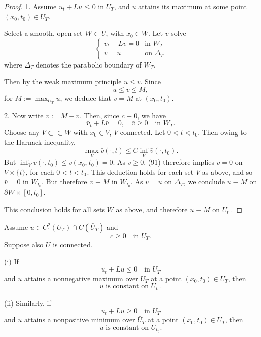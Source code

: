 \begin{proof}
1. Assume $u_t + Lu \leq 0$ in $U_T$, and $u$ attains its maximum at some point $(x_0, t_0) \in U_T$.

Select a smooth, open set $W \subset U$, with $x_0 \in W$. Let $v$ solve
\[
\begin{cases} v_t + Lv = 0 & \text{in } W_T \\ v = u & \text{on } \Delta_T \end{cases}
\]
where $\Delta_T$ denotes the parabolic boundary of $W_T$.

Then by the weak maximum principle $u \leq v$. Since
\[
u \leq v \leq M,
\]
for $M := \max_{U_T} u$, we deduce that $v = M$ at $(x_0, t_0)$.

2. Now write $\bar{v} := M - v$. Then, since $c \equiv 0$, we have
\[
\bar{v}_t + L\bar{v} = 0, \quad \bar{v} \geq 0 \quad \text{in } W_T.
\tag{90}
\]
Choose any $V \subset\subset W$ with $x_0 \in V$, $V$ connected. Let $0 < t < t_0$. Then owing to the Harnack inequality,
\[
\max_V \bar{v}(\cdot, t) \leq C \inf_V \bar{v}(\cdot, t_0).
\tag{91}
\]
But $\inf_V \bar{v}(\cdot, t_0) \leq \bar{v}(x_0, t_0) = 0$. As $\bar{v} \geq 0$, (91) therefore implies $\bar{v} = 0$ on $V \times \{t\}$, for each $0 < t < t_0$. This deduction holds for each set $V$ as above, and so $\bar{v} = 0$ in $W_{t_0}$. But therefore $v \equiv M$ in $W_{t_0}$. As $v = u$ on $\Delta_T$, we conclude $u \equiv M$ on $\partial W \times [0, t_0]$.

This conclusion holds for all sets $W$ as above, and therefore $u \equiv M$ on $U_{t_0}$.
\end{proof}

\begin{theorem}
\label{thm:parabolic-strong-maximum-principle-c-nonneg}
Assume $u \in C_1^2(U_T) \cap C(\bar{U}_T)$ and
\[
c \geq 0 \quad \text{in } U_T.
\]
Suppose also $U$ is connected.

(i) If
\[
u_t + Lu \leq 0 \quad \text{in } U_T
\]
and $u$ attains a nonnegative maximum over $\bar{U}_T$ at a point $(x_0, t_0) \in U_T$, then
\[
u \text{ is constant on } U_{t_0}.
\]

(ii) Similarly, if
\[
u_t + Lu \geq 0 \quad \text{in } U_T
\]
and $u$ attains a nonpositive minimum over $\bar{U}_T$ at a point $(x_0, t_0) \in U_T$, then
\[
u \text{ is constant on } U_{t_0}.
\]
\end{theorem}

